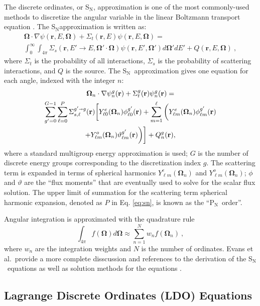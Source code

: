 \documentclass{article} %
\newcommand{\bo}{\mathbf\Omega}
\newcommand{\vecr}{\textbf{r}}
\newcommand{\sn}{S$_\mathrm{N}$}
\newcommand{\pn}{P$_\mathrm{N}$}
\newcommand{\Ye}[2]{\ensuremath{Y^e_{#1}(\bo_#2)}}
\newcommand{\Yo}[2]{\ensuremath{Y^o_{#1}(\bo_#2)}}
\newcommand{\sa}{\shortrightarrow}
\begin{document}
The discrete ordinates, or \sn, approximation is one of the most commonly-used
methods to discretize the angular variable in the linear Boltzmann
transport equation \cite{bg}. The \sn approximation is written as:
%
\begin{multline}
\bo \cdot \nabla \psi(\vecr,E,\bo) + \Sigma_t(\vecr,E) \psi(\vecr,E,\bo) = \\
\int_0^\infty\int_{4\pi} \Sigma_s(\vecr,E'\rightarrow E,\bo'\cdot\bo)
\psi(\vecr,E',\bo')d\bo'dE' + Q(\vecr,E,\bo) \:,
\label{eq:bte}
\end{multline}
%
where $\Sigma_t$ is the probability of all interactions, $\Sigma_s$ is the
probability of scattering interactions, and $Q$ is the source. The \sn\
approximation gives one equation for each angle, indexed with the integer $n$:
%
\begin{multline}
\bo_n \cdot \nabla \psi_n^g(\vecr) + \Sigma_t^g(\vecr)\psi_n^g(\vecr) = \\
\sum_{g'=0}^{G-1}\sum_{\ell=0}^{P}\Sigma_{s,\ell}^{g'\sa g}(\vecr)
\bigg[\Ye{\ell 0}{n}\phi_{\ell 0}^{g'}(\vecr) + \sum_{m=1}^{\ell}
\bigg(\Ye{\ell m}{n}\phi_{\ell m}^{g'}(\vecr) \\
 + \Yo{\ell m}{n}\vartheta_{\ell m}^{g'}(\vecr)\bigg)\bigg]
+ Q_n^g(\vecr),
\label{eq:sn}
\end{multline}
%
where a standard multigroup energy approximation is used; $G$ is the
number of discrete energy groups corresponding to the discretization index
$g$. The scattering term is expanded in terms of spherical harmonics
$\Ye{\ell m}{n}$ and $\Yo{\ell m}{n}$; $\phi$ and $\vartheta$ are the
``flux moments'' that are eventually used to solve for the scalar flux
solution. The upper limit of summation for the scattering term spherical
harmonic expansion, denoted as $P$ in Eq. \eqref{eq:sn}, is known as the
``\pn\ order''.

Angular integration is approximated with the quadrature rule 
%
\begin{equation}
\int_{4\pi} f\left(\bo\right) d\bo \approx \sum_{n=1}^{N}w_n f\left(\bo_n\right)\:,
\label{eq:quadrule}
\end{equation}
%
where $w_n$ are the integration weights and $N$ is the number of ordinates.
Evans et al.\ provide a more complete disscussion and references to the
derivation of the \sn\ equations as well as solution methods for the equations
\cite{denovo}.

\subsection{Lagrange Discrete Ordinates (LDO) Equations}
\end{document}
